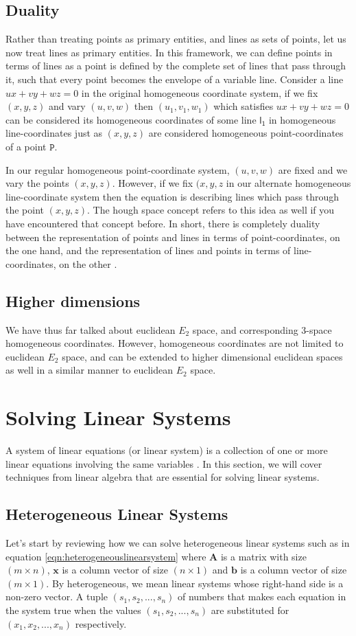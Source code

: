 \documentclass{article}
\newcommand{\mathvecr}[1]{$\bm{#1}$}
\newcommand{\mathmatr}[1]{$\mathbf{#1}$} %
\newcommand{\cogoline}[1]{$\mathsf{#1}$}
\newcommand{\cogopoint}[1]{$\mathtt{#1}$}
\begin{document}
\subsection{Duality}
Rather than treating points as primary entities, and lines as sets of points, let us now treat lines as primary entities. In this framework, we can define points in terms of lines as a point is defined by the complete set of lines that pass through it, such that every point becomes the envelope of a variable line. Consider a line $ux + vy + wz=0$ in the original homogeneous coordinate system, if we fix $(x,y,z)$ and vary $(u,v,w)$ then $(u_1,v_1,w_1)$ which satisfies $ux + vy + wz=0$ can be considered its homogeneous coordinates of some line \cogoline{l_1} in homogeneous line-coordinates just as $(x,y,z)$ are considered homogeneous point-coordinates of a point \cogopoint{P}.

In our regular homogeneous point-coordinate system, $(u,v,w)$ are fixed and we vary the points $(x,y,z)$. However, if we fix $(x,y,z$ in our alternate homogeneous line-coordinate system then the equation is describing lines which pass through the point $(x,y,z)$. The hough space concept refers to this idea as well if you have encountered that concept before. In short, there is completely duality between the representation of points and lines in terms of point-coordinates, on the one hand, and the representation of lines and points in terms of line-coordinates, on the other \cite{semple1952}.

\subsection{Higher dimensions}
We have thus far talked about euclidean $E_2$ space, and corresponding 3-space homogeneous coordinates. However, homogeneous coordinates are not limited to euclidean $E_2$ space, and can be extended to higher dimensional euclidean spaces as well in a similar manner to euclidean $E_2$ space.

\section{Solving Linear Systems}
A system of linear equations (or linear system) is a collection of one or more linear equations involving the same variables \cite{wiki:systemoflinearequations}. In this section, we will cover techniques from linear algebra that are essential for solving linear systems.

\subsection{Heterogeneous Linear Systems}
Let's start by reviewing how we can solve heterogeneous linear systems such as in equation \ref{eqn:heterogeneouslinearsystem} where \mathmatr{A} is a matrix with size $(m \times n)$, \mathvecr{x} is a column vector of size $(n \times 1)$ and \mathvecr{b} is a column vector of size $(m \times 1)$. By heterogeneous, we mean linear systems whose right-hand side is a non-zero vector. A tuple $(s_1,s_2, ...,s_n)$ of numbers that makes each equation in the system true when the values $(s_1,s_2, ...,s_n)$ are substituted for $(x_1, x_2, ..., x_n)$ respectively.
\end{document}
